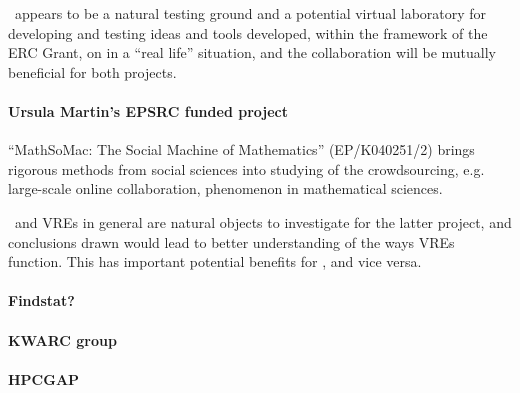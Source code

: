 \TheProject\ appears to be a natural
testing ground and a potential virtual laboratory for developing and testing
ideas and tools developed, within the framework of the ERC Grant, 
on in a ``real life'' situation, and the collaboration
will be mutually beneficial for both projects.

 
\paragraph{Ursula Martin's EPSRC funded project}
``MathSoMac: The Social Machine of Mathematics'' (EP/K040251/2) brings rigorous methods from social
sciences into studying of the crowdsourcing, e.g. large-scale online
collaboration, phenomenon in mathematical sciences. 

\TheProject\ and VREs in general are natural objects to investigate for the
latter project, and conclusions drawn would lead to better understanding
of the ways VREs function. This has important potential benefits for \TheProject, and
vice versa. 



\paragraph{Findstat?}

\paragraph{KWARC group}


\paragraph{HPCGAP}



